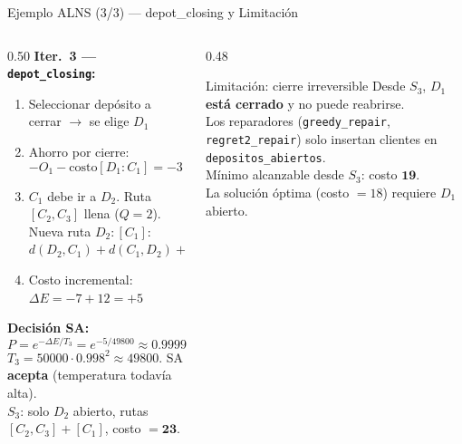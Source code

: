 \documentclass[aspectratio=169,10pt]{beamer}
\begin{document}
\begin{frame}{Ejemplo ALNS (3/3) --- depot\_closing y Limitación}
  \begin{columns}[T,onlytextwidth]
    \begin{column}{0.50\textwidth}
      \textbf{Iter.\ 3 — \texttt{depot\_closing}:}
      \vspace{0.2em}
      \begin{enumerate}\small
        \item Seleccionar depósito a cerrar $\to$ se elige $D_1$
        \item Ahorro por cierre:
              \[ -O_1 - \text{costo}[D_1{:}C_1] = -3 - 4 = -7 \]
        \item $C_1$ debe ir a $D_2$. Ruta $[C_2,C_3]$ llena ($Q{=}2$).\\[0.2em]
              Nueva ruta $D_2{:}[C_1]$:\\
              $d(D_2,C_1){+}d(C_1,D_2){+}F = 5{+}5{+}2 = 12$
        \item Costo incremental: $\Delta E = -7 + 12 = +5$
      \end{enumerate}
      \vspace{0.3em}
      \textbf{Decisión SA:}
      \[ P = e^{-\Delta E / T_3} = e^{-5/49800} \approx \mathbf{0.9999} \]
      \footnotesize $T_3 = 50000\cdot0.998^2 \approx 49800$.
      SA \textbf{acepta} (temperatura todavía alta).\\[0.2em]
      $S_3$: solo $D_2$ abierto, rutas $[C_2,C_3]{+}[C_1]$, costo $= \mathbf{23}$.
    \end{column}
    \begin{column}{0.48\textwidth}
      \begin{alertblock}{Limitación: cierre irreversible}\small
        Desde $S_3$, \textbf{$D_1$ está cerrado} y no puede reabrirse.\\[0.3em]
        Los reparadores (\texttt{greedy\_repair}, \texttt{regret2\_repair}) solo insertan clientes en \texttt{depositos\_abiertos}.\\[0.3em]
        Mínimo alcanzable desde $S_3$: costo $\mathbf{19}$.\\
        La solución óptima (costo $= 18$) requiere $D_1$ abierto.
      \end{alertblock}


\end{column}
\end{columns}
\end{frame}
\end{document}
